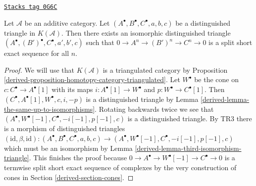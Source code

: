 \begin{lemma}
\label{derived-lemma-improve-distinguished-triangle-homotopy}
\href{https://stacks.math.columbia.edu/tag/0G6C}{\texttt{Stacks tag 0G6C}}

Let $\mathcal{A}$ be an additive category. Let
$(A^\bullet, B^\bullet, C^\bullet, a, b, c)$ be a distinguished triangle in
$K(\mathcal{A})$. Then there exists an isomorphic distinguished triangle
$(A^\bullet, (B')^\bullet, C^\bullet, a', b', c)$ such that
$0 \to A^n \to (B')^n \to C^n \to 0$ is a split short exact sequence
for all $n$.
\end{lemma}

\begin{proof}

We will use that $K(\mathcal{A})$ is a triangulated category by
Proposition \ref{derived-proposition-homotopy-category-triangulated}.
Let $W^\bullet$ be the cone on $c : C^\bullet \to A^\bullet[1]$ with its maps
$i : A^\bullet[1] \to W^\bullet$ and $p : W^\bullet \to C^\bullet[1]$. Then
$(C^\bullet, A^\bullet[1], W^\bullet, c, i, -p)$ is a distinguished triangle
by Lemma \ref{derived-lemma-the-same-up-to-isomorphisms}. Rotating backwards twice
we see that $(A^\bullet, W^\bullet[-1], C^\bullet, -i[-1], p[-1], c)$
is a distinguished triangle. By TR3 there is a morphism of distinguished
triangles
$(\text{id}, \beta, \text{id}) : (A^\bullet, B^\bullet, C^\bullet, a, b, c) \to
(A^\bullet, W^\bullet[-1], C^\bullet, -i[-1], p[-1], c)$
which must be an isomorphism by Lemma \ref{derived-lemma-third-isomorphism-triangle}.
This finishes the proof because
$0 \to A^\bullet \to W^\bullet[-1] \to C^\bullet \to 0$
is a termwise split short exact sequence of complexes
by the very construction of cones in Section \ref{derived-section-cones}.
\end{proof}

